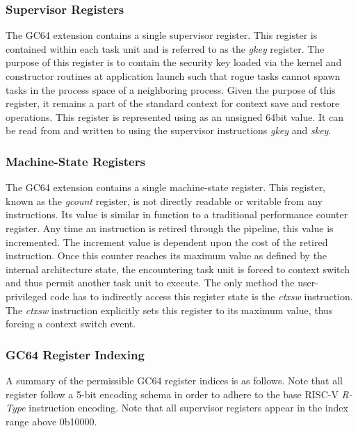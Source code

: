 \documentclass{article}
\begin{document}
\begin{center}
\end{center}

\subsubsection{Supervisor Registers}

The GC64 extension contains a single supervisor register.  This register is contained within each task unit and is referred to as the \emph{gkey} register.  The purpose of this register is to contain the security key loaded via the kernel and constructor routines at application launch such that rogue tasks cannot spawn tasks in the process space of a neighboring process.  Given the purpose of this register, it remains a part of the standard context for context save and restore operations.  This register is represented using as an unsigned 64bit value.  It can be read from and written to using the supervisor instructions \emph{gkey} and \emph{skey}.  

\begin{center}
\end{center}

\subsubsection{Machine-State Registers}

The GC64 extension contains a single machine-state register.  This register, known as the \emph{gcount} register, is not directly readable or writable from any instructions.  Its value is similar in function to a traditional performance counter register.  Any time an instruction is retired through the pipeline, this value is incremented.  The increment value is dependent upon the cost of the retired instruction.  Once this counter reaches its maximum value as defined by the internal architecture state, the encountering task unit is forced to context switch and thus permit another task unit to execute.  The only method the user-privileged code has to indirectly access this register state is the \emph{ctxsw} instruction.  The \emph{ctxsw} instruction explicitly sets this register to its maximum value, thus forcing a context switch event.    

\newpage
\subsubsection{GC64 Register Indexing}
A summary of the permissible GC64 register indices is as follows.
Note that all register follow a 5-bit encoding schema in order to adhere
to the base RISC-V \emph{R-Type} instruction encoding.  
Note that all supervisor registers appear in the index range above 0b10000.
\end{document}
